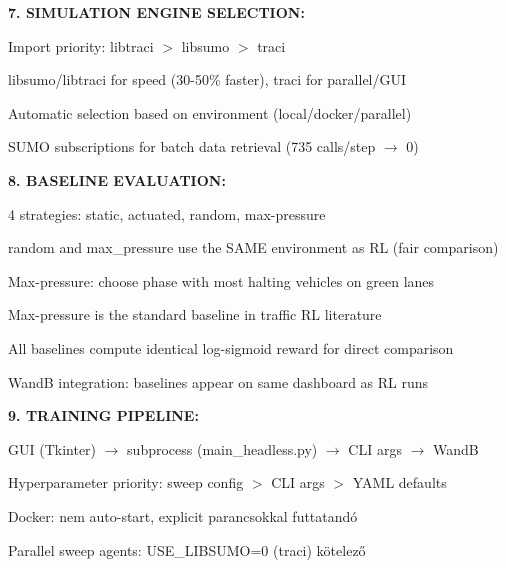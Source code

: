 \documentclass[11pt,a4paper]{article}
\begin{document}
\textbf{7. SIMULATION ENGINE SELECTION:}
\par\noindent\hspace*{1em}\textbullet{} Import priority: libtraci $>$ libsumo $>$ traci
\par\noindent\hspace*{1em}\textbullet{} libsumo/libtraci for speed (30-50\% faster), traci for parallel/GUI
\par\noindent\hspace*{1em}\textbullet{} Automatic selection based on environment (local/docker/parallel)
\par\noindent\hspace*{1em}\textbullet{} SUMO subscriptions for batch data retrieval (735 calls/step $\rightarrow$ 0)

\textbf{8. BASELINE EVALUATION:}
\par\noindent\hspace*{1em}\textbullet{} 4 strategies: static, actuated, random, max-pressure
\par\noindent\hspace*{1em}\textbullet{} random and max\_pressure use the SAME environment as RL (fair comparison)
\par\noindent\hspace*{1em}\textbullet{} Max-pressure: choose phase with most halting vehicles on green lanes
\par\noindent\hspace*{1em}\textbullet{} Max-pressure is the standard baseline in traffic RL literature
\par\noindent\hspace*{1em}\textbullet{} All baselines compute identical log-sigmoid reward for direct comparison
\par\noindent\hspace*{1em}\textbullet{} WandB integration: baselines appear on same dashboard as RL runs

\textbf{9. TRAINING PIPELINE:}
\par\noindent\hspace*{1em}\textbullet{} GUI (Tkinter) $\rightarrow$ subprocess (main\_headless.py) $\rightarrow$ CLI args $\rightarrow$ WandB
\par\noindent\hspace*{1em}\textbullet{} Hyperparameter priority: sweep config $>$ CLI args $>$ YAML defaults
\par\noindent\hspace*{1em}\textbullet{} Docker: nem auto-start, explicit parancsokkal futtatandó
\par\noindent\hspace*{1em}\textbullet{} Parallel sweep agents: USE\_LIBSUMO=0 (traci) kötelező
\end{document}
